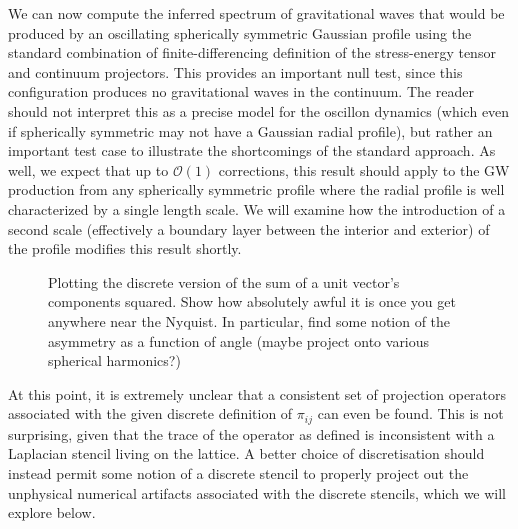 \documentclass{revtex4}
\begin{document}
We can now compute the inferred spectrum of gravitational waves that would be produced by an oscillating spherically symmetric Gaussian profile using the standard combination of finite-differencing definition of the stress-energy tensor and continuum projectors.
This provides an important null test, since this configuration produces no gravitational waves in the continuum.
The reader should not interpret this as a precise model for the oscillon dynamics (which even if spherically symmetric may not have a Gaussian radial profile), but rather an important test case to illustrate the shortcomings of the standard approach.
As well, we expect that up to $\mathcal{O}(1)$ corrections, this result should apply to the GW production from any spherically symmetric profile where the radial profile is well characterized by a single length scale.
We will examine how the introduction of a second scale (effectively a boundary layer between the interior and exterior) of the profile modifies this result shortly.


\begin{figure}
  \caption{Plotting the discrete version of the sum of a unit vector's components squared.  Show how absolutely awful it is once you get anywhere near the Nyquist.  In particular, find some notion of the asymmetry as a function of angle (maybe project onto various spherical harmonics?)}
\end{figure}

At this point, it is extremely unclear that a consistent set of projection operators associated with the given discrete definition of $\pi_{ij}$ can even be found.
This is not surprising, given that the trace of the operator as defined is inconsistent with a Laplacian stencil living on the lattice.
A better choice of discretisation should instead permit some notion of a discrete stencil to properly project out the unphysical numerical artifacts associated with the discrete stencils, which we will explore below.
\end{document}
